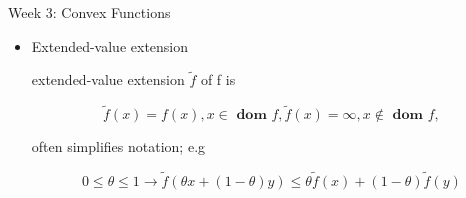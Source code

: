 \documentclass{article}
\begin{document}
\begin{homeworkProblemName}{{\LARGE Week 3: Convex Functions}}
\begin{problemAnswer}
{\begin{itemize}
\begin{itemize}
            $$ g(t) = f(x + tv), \textbf{ dom } g = \{t | x + tv \in \textbf{ dom }
            f\} $$

            \begin{itemize}
            \item is convex (in t) for any x $\in \textbf{dom } f, v \in \bm{R^n}$

            \item can check convexity of f by checking convexity of functions of one
            variable

            \item The intuition here is that a function is convex iff when
              restricted to all lines it is convex
            \end{itemize}

          \item Example: f: $\bm{S}^n \rightarrow \bm{R} \text{ with } f(X) = log det X,
            \textbf{ dom } f = \bm{S}^n_{++}$

            \begin{align*}
              g(t) & = log det(X + tV) \tag{$X + tV = X^{\frac{1}{2}} (I + X^{-\frac{1}{2}} V X^{-\frac{1}{2}}) X^{\frac{1}{2}}$}\\
                   &= log det X + log det (I + tX^{-\frac{1}{2}}VX^{-\frac{1}{2}}) \tag{log det X constant, $\neg$ interesting}\\
              &= log det X + \sum_{i=1}^n log(1 + t \lambda_i) \tag{RHS is concave}\\
            \end{align*}

            where $\lambda_i$ are the eigenvalues of $X^{-\frac{1}{2}}VX^{-\frac{1}{2}}$

            g is concave in t (for any choice of X $\succ$0, V); hence f is concave
          \end{itemize}

        \item Extended-value extension

          extended-value extension $\tilde{f}$ of f is

          $$ \tilde{f}(x) = f(x), x \in \textbf{ dom } f, \tilde{f}(x) = \infty, x \notin
          \textbf{ dom } f, $$

          often simplifies notation; e.g

          $$ 0 \leq \theta \leq 1 \rightarrow \tilde{f}(\theta x + (1 - \theta)y) \leq \theta \tilde{f}(x) + (1 - \theta)\tilde{f}(y) $$


\end{itemize}}
\end{problemAnswer}
\end{homeworkProblemName}
\end{document}
